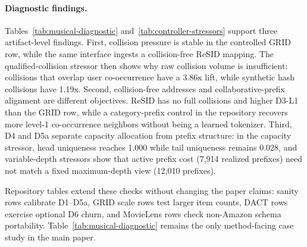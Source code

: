 \paragraph{Diagnostic findings.}
Tables~\ref{tab:musical-diagnostic} and~\ref{tab:controller-stressors} support
three artifact-level findings. First, collision pressure is stable in the
controlled GRID row, while the same interface ingests a collision-free ReSID
mapping. The qualified-collision stressor then shows why raw collision volume
is insufficient: collisions that overlap user co-occurrence have a 3.86x lift,
while synthetic hash collisions have 1.19x. Second, collision-free addresses
and collaborative-prefix alignment are different objectives. ReSID has no full
collisions and higher D3-L1 than the GRID row, while a category-prefix control
in the repository recovers more level-1 co-occurrence neighbors without being a
learned tokenizer. Third, D4 and D5a separate capacity allocation from prefix
structure: in the capacity stressor, head uniqueness reaches 1.000 while tail
uniqueness remains 0.028, and variable-depth stressors show that active prefix
cost (7,914 realized prefixes) need not match a fixed maximum-depth view
(12,010 prefixes).

Repository tables extend these checks without changing the paper claims:
sanity rows calibrate D1--D5a, GRID scale rows test larger item counts, DACT
rows exercise optional D6 churn, and MovieLens rows check non-Amazon schema
portability. Table~\ref{tab:musical-diagnostic} remains the only method-facing
case study in the main paper.
